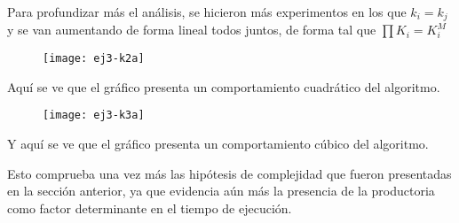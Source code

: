 Para profundizar más el análisis, se hicieron más experimentos en los que $k_i = k_j$ y se van aumentando de forma lineal todos juntos, de forma tal que $\prod K_i = K_i^M$

\begin{figure}[H]
		\centering
		\texttt{[image: ej3-k2a]}
	\end{figure}	

Aquí se ve que el gráfico presenta un comportamiento cuadrático del algoritmo.

\begin{figure}[H]
		\centering
		\texttt{[image: ej3-k3a]}
	\end{figure}	

Y aquí se ve que el gráfico presenta un comportamiento cúbico del algoritmo.

Esto comprueba una vez más las hipótesis de complejidad que fueron presentadas en la sección anterior, ya que evidencia aún más la presencia de la productoria como factor determinante en el tiempo de ejecución.